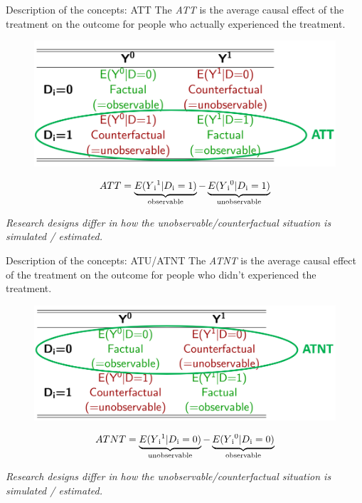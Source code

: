 \documentclass{beamer}\usepackage[]{graphicx}\usepackage[]{xcolor}
\begin{document}
\begin{frame}{Description of the concepts: ATT}
The \textit{ATT} is the average causal effect of the treatment on the outcome for people who actually experienced the treatment.
\begin{figure}
\centering
\includegraphics[width=1\textwidth]{Graphics/ATT.png}
\end{figure}
\begin{equation}
ATT = \underbrace{E(Y\textsubscript{i}\textsuperscript{1} \vert D\textsubscript{i}=1)}_\text{observable} - \underbrace{E(Y\textsubscript{i}\textsuperscript{0} \vert D\textsubscript{i}=1)}_\text{unobservable}
\end{equation} 

\small\textit{Research designs differ in how the unobservable/counterfactual situation is simulated / estimated.}
\end{frame}


\begin{frame}{Description of the concepts: ATU/ATNT}
The \textit{ATNT} is the average causal effect of the treatment on the outcome for people who didn't experienced the treatment.
\begin{figure}
\centering
\includegraphics[width=1\textwidth]{Graphics/ATNT.png}
\end{figure}
\begin{equation}
ATNT = \underbrace{E(Y\textsubscript{i}\textsuperscript{1} \vert D\textsubscript{i}=0)}_\text{unobservable} - \underbrace{E(Y\textsubscript{i}\textsuperscript{0} \vert D\textsubscript{i}=0)}_\text{observable}
\end{equation} 

\small\textit{Research designs differ in how the unobservable/counterfactual situation is simulated / estimated.}
\end{frame}
\end{document}
